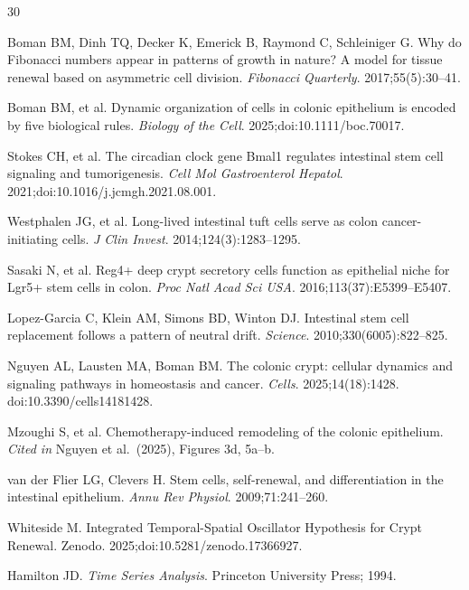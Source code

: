 \documentclass[11pt,letterpaper]{article}
\theoremstyle{definition}
\theoremstyle{remark}
\begin{document}

\begin{thebibliography}{30}

Boman BM, Dinh TQ, Decker K, Emerick B, Raymond C, Schleiniger G.
Why do Fibonacci numbers appear in patterns of growth in nature? A model for tissue renewal based on asymmetric cell division.
\textit{Fibonacci Quarterly}. 2017;55(5):30--41.

Boman BM, et al.
Dynamic organization of cells in colonic epithelium is encoded by five biological rules.
\textit{Biology of the Cell}. 2025;doi:10.1111/boc.70017.

Stokes CH, et al.
The circadian clock gene Bmal1 regulates intestinal stem cell signaling and tumorigenesis.
\textit{Cell Mol Gastroenterol Hepatol}. 2021;doi:10.1016/j.jcmgh.2021.08.001.

Westphalen JG, et al.
Long-lived intestinal tuft cells serve as colon cancer-initiating cells.
\textit{J Clin Invest}. 2014;124(3):1283--1295.

Sasaki N, et al.
Reg4+ deep crypt secretory cells function as epithelial niche for Lgr5+ stem cells in colon.
\textit{Proc Natl Acad Sci USA}. 2016;113(37):E5399--E5407.

Lopez-Garcia C, Klein AM, Simons BD, Winton DJ.
Intestinal stem cell replacement follows a pattern of neutral drift.
\textit{Science}. 2010;330(6005):822--825.

Nguyen AL, Lausten MA, Boman BM.
The colonic crypt: cellular dynamics and signaling pathways in homeostasis and cancer.
\textit{Cells}. 2025;14(18):1428. doi:10.3390/cells14181428.

Mzoughi S, et al.
Chemotherapy-induced remodeling of the colonic epithelium.
\textit{Cited in} Nguyen et al.\ (2025), Figures 3d, 5a--b.

van der Flier LG, Clevers H.
Stem cells, self-renewal, and differentiation in the intestinal epithelium.
\textit{Annu Rev Physiol}. 2009;71:241--260.

Whiteside M.
Integrated Temporal-Spatial Oscillator Hypothesis for Crypt Renewal.
Zenodo. 2025;doi:10.5281/zenodo.17366927.

Hamilton JD.
\textit{Time Series Analysis}. Princeton University Press; 1994.


\end{thebibliography}
\end{document}
